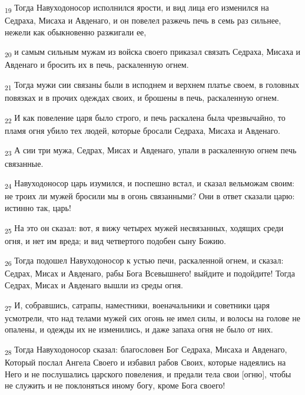 \begin{tcolorbox}
\textsubscript{19} Тогда Навуходоносор исполнился ярости, и вид лица его изменился на Седраха, Мисаха и Авденаго, и он повелел разжечь печь в семь раз сильнее, нежели как обыкновенно разжигали ее,
\end{tcolorbox}
\begin{tcolorbox}
\textsubscript{20} и самым сильным мужам из войска своего приказал связать Седраха, Мисаха и Авденаго и бросить их в печь, раскаленную огнем.
\end{tcolorbox}
\begin{tcolorbox}
\textsubscript{21} Тогда мужи сии связаны были в исподнем и верхнем платье своем, в головных повязках и в прочих одеждах своих, и брошены в печь, раскаленную огнем.
\end{tcolorbox}
\begin{tcolorbox}
\textsubscript{22} И как повеление царя было строго, и печь раскалена была чрезвычайно, то пламя огня убило тех людей, которые бросали Седраха, Мисаха и Авденаго.
\end{tcolorbox}
\begin{tcolorbox}
\textsubscript{23} А сии три мужа, Седрах, Мисах и Авденаго, упали в раскаленную огнем печь связанные.
\end{tcolorbox}
\begin{tcolorbox}
\textsubscript{24} Навуходоносор царь изумился, и поспешно встал, и сказал вельможам своим: не троих ли мужей бросили мы в огонь связанными? Они в ответ сказали царю: истинно так, царь!
\end{tcolorbox}
\begin{tcolorbox}
\textsubscript{25} На это он сказал: вот, я вижу четырех мужей несвязанных, ходящих среди огня, и нет им вреда; и вид четвертого подобен сыну Божию.
\end{tcolorbox}
\begin{tcolorbox}
\textsubscript{26} Тогда подошел Навуходоносор к устью печи, раскаленной огнем, и сказал: Седрах, Мисах и Авденаго, рабы Бога Всевышнего! выйдите и подойдите! Тогда Седрах, Мисах и Авденаго вышли из среды огня.
\end{tcolorbox}
\begin{tcolorbox}
\textsubscript{27} И, собравшись, сатрапы, наместники, военачальники и советники царя усмотрели, что над телами мужей сих огонь не имел силы, и волосы на голове не опалены, и одежды их не изменились, и даже запаха огня не было от них.
\end{tcolorbox}
\begin{tcolorbox}
\textsubscript{28} Тогда Навуходоносор сказал: благословен Бог Седраха, Мисаха и Авденаго, Который послал Ангела Своего и избавил рабов Своих, которые надеялись на Него и не послушались царского повеления, и предали тела свои [огню], чтобы не служить и не поклоняться иному богу, кроме Бога своего!
\end{tcolorbox}
